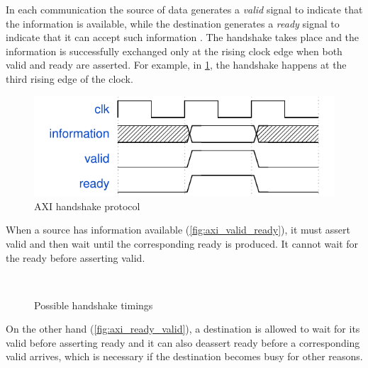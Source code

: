 In each communication the source of data generates a \emph{valid} signal to indicate that the information is available, while the destination generates a \emph{ready} signal to indicate that it can accept such information \cite[p.~A3-41]{axi}. The handshake takes place and the information is successfully exchanged only at the rising clock edge when both valid and ready are asserted. For example, in \cref{fig:axi}, the handshake happens at the third rising edge of the clock.
\begin{figure}[hbt]
  \centering
  \includegraphics[scale=.9]{img/axi.pdf}
  \caption{AXI handshake protocol}
  \label{fig:axi}
\end{figure}

When a source has information available (\cref{fig:axi_valid_ready}), it must assert valid and then wait until the corresponding ready is produced. It cannot wait for the ready before asserting valid.
\begin{figure}[hbt]
  \centering
   \\
  \caption{Possible handshake timings}
  \label{fig:axi_timings}
\end{figure}
On the other hand (\cref{fig:axi_ready_valid}), a destination is allowed to wait for its valid before asserting ready and it can also deassert ready before a corresponding valid arrives, which is necessary if the destination becomes busy for other reasons.

